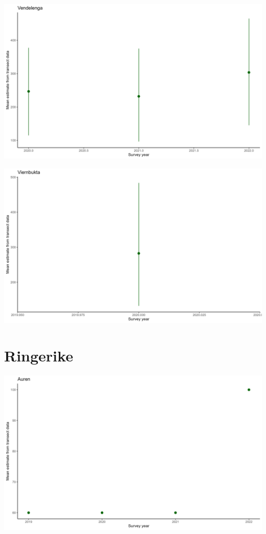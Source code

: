 \documentclass[
  letterpaper,
  DIV=11,
  numbers=noendperiod]{scrreport}
\begin{document}
\includegraphics{Figurer/trans_Est/Vendelenga_plot.png}

\includegraphics{Figurer/trans_Est/Viernbukta_plot.png}

\hypertarget{ringerike-3}{%
\section{Ringerike}\label{ringerike-3}}

\includegraphics{Figurer/trans_Est/Auren_plot.png}
\end{document}
